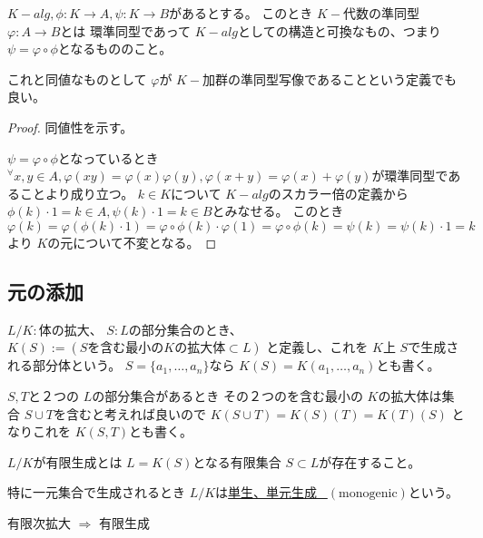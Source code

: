\documentclass[../master_galois_theory]{subfiles}
\begin{document}
\begin{defi}
  $K-alg , \phi : K \longrightarrow A , \psi : K \longrightarrow B$があるとする。
  このとき $K-$代数の準同型 $\varphi : A \longrightarrow B$とは
  環準同型であって $K-alg$としての構造と可換なもの、つまり $\psi = \varphi \circ \phi$となるもののこと。

  これと同値なものとして $\varphi$が $K-$加群の準同型写像であることという定義でも良い。
\end{defi}

\begin{proof}
  同値性を示す。

  $\psi = \varphi \circ \phi$となっているとき
  ${}^\forall x , y \in A , \varphi(xy) = \varphi(x) \varphi(y) , \varphi(x + y) = \varphi(x) + \varphi(y)$が環準同型であることより成り立つ。
  $k \in K$について $K-alg$のスカラー倍の定義から $\phi(k) \cdot 1 = k \in A , \psi(k) \cdot 1 = k \in B$とみなせる。
  このとき $\varphi(k) = \varphi(\phi(k) \cdot 1) = \varphi \circ \phi(k) \cdot \varphi(1) = \varphi \circ \phi(k) = \psi(k) = \psi(k) \cdot 1 = k$より $K$の元について不変となる。

\end{proof}

\subsection{元の添加}

\begin{defi}
  $L/K:$体の拡大、 $S:L$の部分集合のとき、
  $K(S) := (Sを含む最小のKの拡大体 \subset L)$
  と定義し、これを $K$上 $S$で生成される部分体という。
  $S = \{ a_1 , \dots , a_n\}$なら
  $K(S) = K(a_1 , \dots , a_n)$とも書く。

  $S,T$と２つの $L$の部分集合があるとき
  その２つのを含む最小の $K$の拡大体は集合 $S \cup T$を含むと考えれば良いので
  $K(S \cup T) = K(S)(T) = K(T)(S)$
  となりこれを $K(S,T)$とも書く。
\end{defi}

\begin{defi}
  $L/K$が有限生成とは $L = K(S)$となる有限集合 $S \subset L$が存在すること。

  特に一元集合で生成されるとき $L/K$は\underline{単生、単元生成 \  $(\mathrm{monogenic})$}という。
\end{defi}

\begin{rem}
  有限次拡大 $\Rightarrow$ 有限生成
\end{rem}
\end{document}

